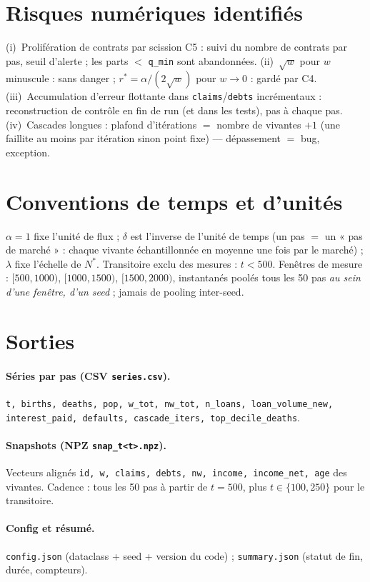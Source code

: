 \documentclass[11pt,a4paper]{article}
\newcommand{\code}[1]{\texttt{#1}}
\begin{document}
\section{Risques numériques identifiés}
(i)~Prolifération de contrats par scission C5 : suivi du nombre de contrats
par pas, seuil d'alerte ; les parts $<$ \code{q\_min} sont abandonnées.
(ii)~$\sqrt{w}$ pour $w$ minuscule : sans danger ; $r^* = \alpha/(2\sqrt w)$
pour $w \to 0$ : gardé par C4. (iii)~Accumulation d'erreur flottante dans
\code{claims}/\code{debts} incrémentaux : reconstruction de contrôle en fin
de run (et dans les tests), pas à chaque pas. (iv)~Cascades longues :
plafond d'itérations $=$ nombre de vivantes $+ 1$ (une faillite au moins par
itération sinon point fixe) — dépassement $=$ bug, exception.

\section{Conventions de temps et d'unités}
$\alpha = 1$ fixe l'unité de flux ; $\delta$ est l'inverse de l'unité de
temps (un pas $=$ un « pas de marché » : chaque vivante échantillonnée en
moyenne une fois par le marché) ; $\lambda$ fixe l'échelle de $N^*$.
Transitoire exclu des mesures : $t < 500$. Fenêtres de mesure :
$[500,1000)$, $[1000,1500)$, $[1500,2000)$, instantanés poolés tous les 50
pas \emph{au sein d'une fenêtre, d'un seed} ; jamais de pooling inter-seed.

\section{Sorties}
\paragraph{Séries par pas (CSV \code{series.csv}).} \code{t, births, deaths,
pop, w\_tot, nw\_tot, n\_loans, loan\_volume\_new, interest\_paid,
defaults, cascade\_iters, top\_decile\_deaths}.
\paragraph{Snapshots (NPZ \code{snap\_t<t>.npz}).} Vecteurs alignés
\code{id, w, claims, debts, nw, income, income\_net, age} des vivantes.
Cadence : tous les 50 pas à partir de $t=500$, plus $t \in \{100, 250\}$
pour le transitoire.
\paragraph{Config et résumé.} \code{config.json} (dataclass + seed + version
du code) ; \code{summary.json} (statut de fin, durée, compteurs).
\end{document}
